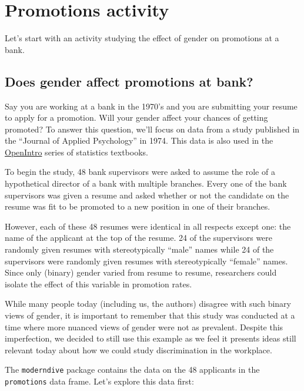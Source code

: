 \documentclass[
]{book}
\begin{document}
\hypertarget{ht-activity}{%
\section{Promotions activity}\label{ht-activity}}

Let's start with an activity studying the effect of gender on promotions at a bank.

\hypertarget{does-gender-affect-promotions-at-bank}{%
\subsection{Does gender affect promotions at bank?}\label{does-gender-affect-promotions-at-bank}}

Say you are working at a bank in the 1970's and you are submitting your resume to apply for a promotion. Will your gender affect your chances of getting promoted? To answer this question, we'll focus on data from a study published in the ``Journal of Applied Psychology'' in 1974. This data is also used in the \href{https://www.openintro.org/}{OpenIntro} series of statistics textbooks.

To begin the study, 48 bank supervisors were asked to assume the role of a hypothetical director of a bank with multiple branches. Every one of the bank supervisors was given a resume and asked whether or not the candidate on the resume was fit to be promoted to a new position in one of their branches.

However, each of these 48 resumes were identical in all respects except one: the name of the applicant at the top of the resume. 24 of the supervisors were randomly given resumes with stereotypically ``male'' names while 24 of the supervisors were randomly given resumes with stereotypically ``female'' names. Since only (binary) gender varied from resume to resume, researchers could isolate the effect of this variable in promotion rates.

While many people today (including us, the authors) disagree with such binary views of gender, it is important to remember that this study was conducted at a time where more nuanced views of gender were not as prevalent. Despite this imperfection, we decided to still use this example as we feel it presents ideas still relevant today about how we could study discrimination in the workplace.

The \texttt{moderndive} package contains the data on the 48 applicants in the \texttt{promotions} data frame. Let's explore this data first:
\end{document}
